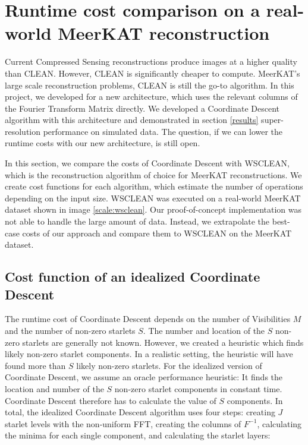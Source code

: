 \section{Runtime cost comparison on a real-world MeerKAT reconstruction}\label{scale}
Current Compressed Sensing reconstructions produce images at a higher quality than CLEAN. However, CLEAN is significantly cheaper to compute. MeerKAT's large scale reconstruction problems, CLEAN is still the go-to algorithm. In this project, we developed for a new architecture, which uses the relevant columns of the Fourier Transform Matrix directly. We developed a Coordinate Descent algorithm with this architecture and demonstrated in section \ref{results} super-resolution performance on simulated data. The question, if we can lower the runtime costs with our new architecture, is still open. 

In this section, we compare the costs of Coordinate Descent with WSCLEAN, which is the reconstruction algorithm of choice for MeerKAT reconstructions. We create cost functions for each algorithm, which estimate the number of operations depending on the input size. WSCLEAN was executed on a real-world MeerKAT dataset shown in image \ref{scale:wsclean}. Our proof-of-concept implementation was not able to handle the large amount of data. Instead, we extrapolate the best-case costs of our approach and compare them to WSCLEAN on the MeerKAT dataset.


\subsection{Cost function of an idealized Coordinate Descent}
The runtime cost of Coordinate Descent depends on the number of Visibilities $M$ and the number of non-zero starlets $S$. The number and location of the $S$ non-zero starlets are generally not known. However, we created a heuristic which finds likely non-zero starlet components. In a realistic setting, the heuristic will have found more than $S$ likely non-zero starlets. For the idealized version of Coordinate Descent, we assume an oracle performance heuristic: It finds the location and number of the $S$ non-zero starlet components in constant time. Coordinate Descent therefore has to calculate the value of $S$  components. In total, the idealized Coordinate Descent algorithm uses four steps: creating $J$ starlet levels with the non-uniform FFT, creating the columns of $F^{-1}$, calculating the minima for each single component, and calculating the starlet layers:

